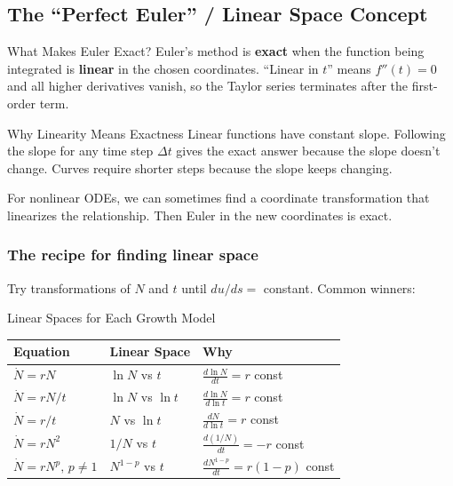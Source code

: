 \documentclass[11pt]{article}
\begin{document}
\subsection{The ``Perfect Euler'' / Linear Space Concept}

\begin{conceptbox}{What Makes Euler Exact?}
Euler's method is \textbf{exact} when the function being integrated is \textbf{linear} in the chosen coordinates. ``Linear in $t$'' means $f''(t) = 0$ and all higher derivatives vanish, so the Taylor series terminates after the first-order term.
\end{conceptbox}

\begin{intuitionbox}{Why Linearity Means Exactness}
Linear functions have constant slope. Following the slope for any time step $\Delta t$ gives the exact answer because the slope doesn't change. Curves require shorter steps because the slope keeps changing.

For nonlinear ODEs, we can sometimes find a coordinate transformation that linearizes the relationship. Then Euler in the new coordinates is exact.
\end{intuitionbox}

\subsubsection{The recipe for finding linear space} Try transformations of $N$ and $t$ until $du/ds = $ constant. Common winners:

\begin{summarybox}{Linear Spaces for Each Growth Model}
\renewcommand{\arraystretch}{1.4}
\begin{tabular}{p{4cm}p{4cm}p{5cm}}
\toprule
\textbf{Equation} & \textbf{Linear Space} & \textbf{Why}\\
\midrule
$\dot N = rN$ & $\ln N$ vs $t$ & $\frac{d\ln N}{dt} = r$ const\\
$\dot N = rN/t$ & $\ln N$ vs $\ln t$ & $\frac{d\ln N}{d\ln t} = r$ const\\
$\dot N = r/t$ & $N$ vs $\ln t$ & $\frac{dN}{d\ln t} = r$ const\\
$\dot N = rN^2$ & $1/N$ vs $t$ & $\frac{d(1/N)}{dt} = -r$ const\\
$\dot N = rN^p,\,p\neq 1$ & $N^{1-p}$ vs $t$ & $\frac{dN^{1-p}}{dt} = r(1-p)$ const\\
\bottomrule
\end{tabular}
\end{summarybox}
\end{document}
